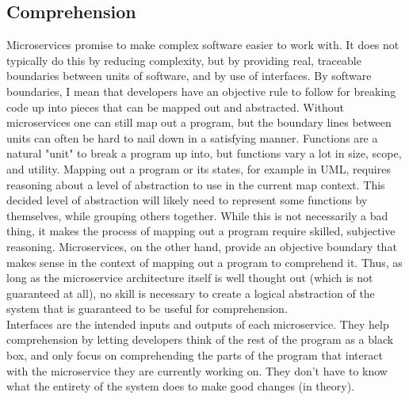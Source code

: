 \subsection{Comprehension}
Microservices promise to make complex software easier to work with. 
It does not typically do this by reducing complexity, but by providing real, traceable boundaries between units of software, and by use of interfaces.
By software boundaries, I mean that developers have an objective rule to follow for breaking code up into pieces that can be mapped out and abstracted.
Without microservices one can still map out a program, but the boundary lines between units can often be hard to nail down in a satisfying manner.
Functions are a natural "unit" to break a program up into, but functions vary a lot in size, scope, and utility.
Mapping out a program or its states, for example in UML, requires reasoning about a level of abstraction to use in the current map context. 
This decided level of abstraction will likely need to represent some functions by themselves, while grouping others together. 
While this is not necessarily a bad thing, it makes the process of mapping out a program require skilled, subjective reasoning. 
Microservices, on the other hand, provide an objective boundary that makes sense in the context of mapping out a program to comprehend it.
Thus, as long as the microservice architecture itself is well thought out (which is not guaranteed at all), no skill is necessary to create a logical abstraction of the system that is guaranteed to be useful for comprehension.\\

Interfaces are the intended inputs and outputs of each microservice. 
They help comprehension by letting developers think of the rest of the program as a black box, and only focus on comprehending the parts of the program that interact with the microservice they are currently working on.
They don't have to know what the entirety of the system does to make good changes (in theory).

